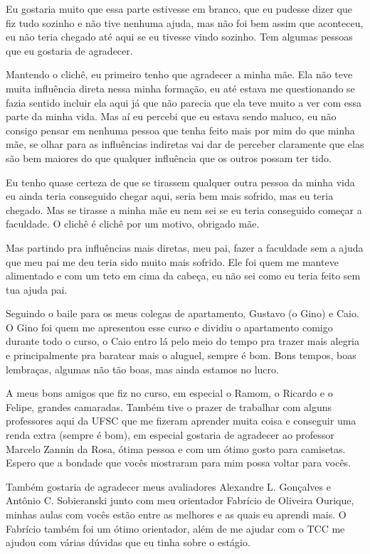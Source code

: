 \begin{agradecimentos}
Eu gostaria muito que essa parte estivesse em branco, que eu pudesse dizer que fiz tudo sozinho e não tive nenhuma ajuda, mas não foi bem assim que aconteceu, eu não teria chegado até aqui se eu tivesse vindo sozinho. Tem algumas pessoas que eu gostaria de agradecer.

Mantendo o clichê, eu primeiro tenho que agradecer a minha mãe. Ela não teve muita influência direta nessa minha formação, eu até estava me questionando se fazia sentido incluir ela aqui já que não parecia que ela teve muito a ver com essa parte da minha vida. Mas aí eu percebi que eu estava sendo maluco, eu não consigo pensar em nenhuma pessoa que tenha feito mais por mim do que minha mãe, se olhar para as influências indiretas vai dar de perceber claramente que elas são bem maiores do que qualquer influência que os outros possam ter tido.

Eu tenho quase certeza de que se tirassem qualquer outra pessoa da minha vida eu ainda teria conseguido chegar aqui, seria bem mais sofrido, mas eu teria chegado. Mas se tirasse a minha mãe eu nem sei se eu teria conseguido começar a faculdade. O clichê é clichê por um motivo, obrigado mãe.

Mas partindo pra influências mais diretas, meu pai, fazer a faculdade sem a ajuda que meu pai me deu teria sido muito mais sofrido. Ele foi quem me manteve alimentado e com um teto em cima da cabeça, eu não sei como eu teria feito sem tua ajuda pai.

Seguindo o baile para os meus colegas de apartamento, Gustavo (o Gino) e Caio. O Gino foi quem me apresentou esse curso e dividiu o apartamento comigo durante todo o curso, o Caio entro lá pelo meio do tempo pra trazer mais alegria e principalmente pra baratear mais o aluguel, sempre é bom. Bons tempos, boas lembraças, algumas não tão boas, mas ainda estamos no lucro.

A meus bons amigos que fiz no curso, em especial o Ramom, o Ricardo e o Felipe, grandes camaradas. Também tive o prazer de trabalhar com alguns professores aqui da UFSC que me fizeram aprender muita coisa e conseguir uma renda extra (sempre é bom), em especial gostaria de agradecer ao professor Marcelo Zannin da Rosa, ótima pessoa e com um ótimo gosto para camisetas. Espero que a bondade que vocês mostraram para mim possa voltar para vocês.

Também gostaria de agradecer meus avaliadores Alexandre L. Gonçalves e Antônio C. Sobieranski junto com meu orientador Fabrício de Oliveira Ourique, minhas aulas com vocês estão entre as melhores e as quais eu aprendi mais. O Fabrício também foi um ótimo orientador, além de me ajudar com o TCC me ajudou com várias dúvidas que eu tinha sobre o estágio.


\end{agradecimentos}
